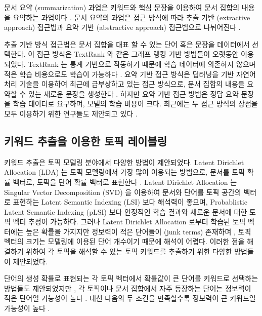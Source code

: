 \documentclass[oneside, ko,phd]{snuthesis_utf8_kor}
\begin{document}
문서 요약 (summarization) 과업은 키워드와 핵심 문장을 이용하여 문서 집합의 내용을 요약하는 과업이다 \cite{yao2017recent}.
문서 요약의 과업은 접근 방식에 따라 추출 기반 (extractive approach) 접근법과 요약 기반 (abstractive approach) 접근법으로 나뉘어진다 \cite{yao2017recent}.

추출 기반 방식 접근법은 문서 집합을 대표 할 수 있는 단어 혹은 문장을 데이터에서 선택한다.
이 접근 방식은 TextRank \cite{mihalcea2004textrank} 와 같은 그래프 랭킹 기반 방법들이 오랫동안 이용되었다.
TextRank 는 통계 기반으로 작동하기 때문에 학습 데이터에 의존하지 않으며 적은 학습 비용으로도 학습이 가능하다 \cite{parveen2015topical, narayan2018ranking}.
요약 기반 접근 방식은 딥러닝을 기반 자연어처리 기술을 이용하여 최근에 급부상하고 있는 접근 방식으로, 문서 집합의 내용을 요약할 수 있는 새로운 문장을 생성한다 \cite{nallapati2016abstractive}.
하지만 요약 기반 접근 방법은 정답 요약 문장을 학습 데이터로 요구하며, 모델의 학습 비용이 크다.
최근에는 두 접근 방식의 장점을 모두 이용하기 위한 연구들도 제안되고 있다 \cite{banerjee2015multi, bing2015abstractive, gu2016incorporating}.


\subsection{키워드 추출을 이용한 토픽 레이블링}

키워드 추출은 토픽 모델링 분야에서 다양한 방법이 제안되었다.
Latent Dirichlet Allocation (LDA) 는 토픽 모델링에서 가장 많이 이용되는 방법으로, 문서를 토픽 확률 벡터로, 토픽을 단어 확률 벡터로 표현한다 \cite{blei2003latent}.
Latent Dirichlet Allocation 는 Singular Vector Decomposition (SVD) 을 이용하여 문서와 단어를 토픽 공간의 벡터로 표현하는 Latent Semantic Indexing (LSI) \cite{landauer1998introduction} 보다 해석력이 좋으며, Probablistic Latent Semantic Indexing (pLSI) \cite{hofmann1999probabilistic} 보다 안정적인 학습 결과와 새로운 문서에 대한 토픽 벡터 추정이 가능하다. 그러나 Latent Dirichlet Allocation 로부터 학습된 토픽 벡터에는 높은 확률을 가지지만 정보력이 적은 단어들이 (junk terms) 존재하며 \cite{newman2010evaluating}, 토픽 벡터의 크기는 모델링에 이용된 단어 개수이기 때문에 해석이 어렵다.
이러한 점을 해결하기 위하여 각 토픽을 해석할 수 있는 토픽 키워드를 추출하기 위한 다양한 방법들이 제안되었다. 

단어의 생성 확률로 표현되는 각 토픽 벡터에서 확률값이 큰 단어를 키워드로 선택하는 방법들도 제안되었지만 \cite{snyder2013topic, chuang2013topic, wallach2009evaluation}, 각 토픽이나 문서 집합에서 자주 등장하는 단어는 정보력이 적은 단어일 가능성이 높다 \cite{ramage09tmsocial, newman2010evaluating, chuang2012interpretation}.
대신 다음의 두 조건을 만족할수록 정보력이 큰 키워드일 가능성이 높다 \cite{chuang2012termite}.
\end{document}
